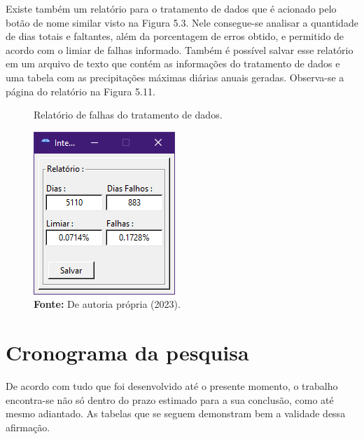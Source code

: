 Existe também um relatório para o tratamento de dados que é acionado pelo botão de nome similar visto na Figura 5.3. Nele consegue-se analisar a quantidade de dias totais e faltantes, além da porcentagem de erros obtido, e permitido de acordo com o limiar de falhas informado. Também é possível salvar esse relatório em um arquivo de texto que contém as informações do tratamento de dados e uma tabela com as precipitações máximas diárias anuais geradas. Observa-se a página do relatório na Figura 5.11.\bigskip

\begin{figure}[!ht]
	\centering
	\caption{Relatório de falhas do tratamento de dados.}
	\includegraphics[width=.21\linewidth]{figuras/relatorio_de_falhas.png}
	\caption*{\textbf{Fonte:} De autoria própria (2023).}
	\label{fig:figuras/relatorio_de_falhas.png}
\end{figure}

\newpage

\section{Cronograma da pesquisa}

De acordo com tudo que foi desenvolvido até o presente momento, o trabalho encontra-se não só dentro do prazo estimado para a sua conclusão, como até mesmo adiantado. As tabelas que se seguem demonstram bem a validade dessa afirmação.\bigskip


